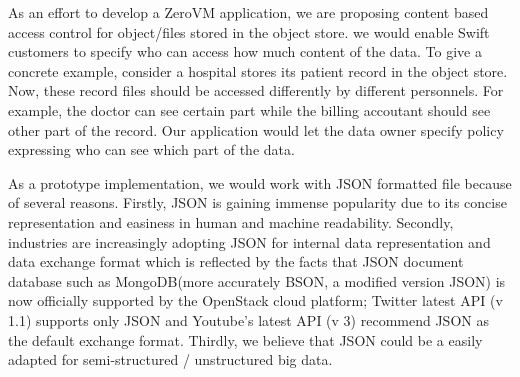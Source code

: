 As an effort to develop a  ZeroVM application, we are proposing content based access control for object/files  stored in the object store.  we would enable Swift customers to specify who can access how much content of the  data. To give a concrete example, consider a hospital stores its patient record  in the object store. Now, these record files should be accessed differently by different personnels. For example, the doctor can see certain part  while the billing accoutant should see other part of the record. Our application would let the data owner specify policy expressing who can see which part of the data.

As  a prototype implementation, we would work with JSON formatted file because of several reasons. Firstly, JSON is gaining immense popularity due to its concise representation and easiness in human and machine readability. Secondly, industries are increasingly adopting JSON for internal data representation and data exchange format which is reflected by the facts that JSON  document database such as MongoDB(more accurately BSON, a modified version JSON) is now officially supported by the OpenStack cloud platform; Twitter latest API (v 1.1) supports only JSON and Youtube’s latest API (v 3) \cite{identityv3} recommend JSON as the default exchange format. Thirdly, we believe that JSON could be a easily adapted  for semi-structured / unstructured big data. 


